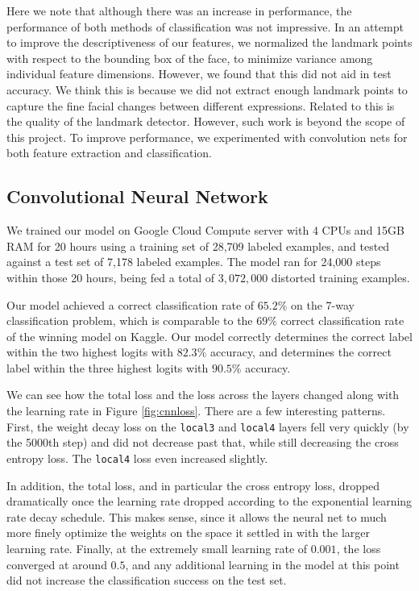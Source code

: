\documentclass[10pt, twocolumn, twoside]{article}
\begin{document}
Here we note that although there was an increase in performance, the performance
of both methods of classification was not impressive. In an attempt to improve
the descriptiveness of our features, we normalized the landmark points with respect
to the bounding box of the face, to minimize variance among individual feature
dimensions. However, we found that this did not aid in test accuracy. We think this
is because we did not extract enough landmark points to capture the fine facial
changes between different expressions. Related to this is the quality of the
landmark detector. However, such work is beyond the scope of this project.
To improve performance, we experimented with convolution nets for both feature
extraction and classification.

\subsection{Convolutional Neural Network}

We trained our model on Google Cloud Compute server with 4 CPUs and 15GB RAM for 20 hours using a training set of 28,709 labeled examples, and tested against a test set of 7,178 labeled examples. The model ran for 24,000 steps within those 20 hours, being fed a total of $3,072,000$ distorted training examples.

Our model achieved a correct classification rate of $65.2\%$ on the 7-way classification problem, which is comparable to the $69\%$ correct classification rate of the winning model on Kaggle. Our model correctly determines the correct label within the two highest logits with $82.3\%$ accuracy, and determines the correct label within the three highest logits with $90.5\%$ accuracy.

We can see how the total loss and the loss across the layers changed along with the learning rate in Figure \ref{fig:cnnloss}. There are a few interesting patterns. First, the weight decay loss on the \texttt{local3} and \texttt{local4} layers fell very quickly (by the 5000th step) and did not decrease past that, while still decreasing the cross entropy loss. The \texttt{local4} loss even increased slightly. 

In addition, the total loss, and in particular the cross entropy loss, dropped dramatically once the learning rate dropped according to the exponential learning rate decay schedule. This makes sense, since it allows the neural net to much more finely optimize the weights on the space it settled in with the larger learning rate. Finally, at the extremely small learning rate of $0.001$, the loss converged at around $0.5$, and any additional learning in the model at this point did not increase the classification success on the test set.
\end{document}
